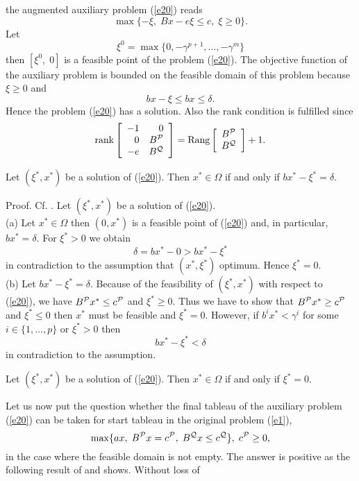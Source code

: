 the augmented auxiliary problem (\ref{e20}) reads
%
\begin{equation} \label{e21}
\max \{- \xi , \; Bx - e\xi  \leq c, \; \xi  \geq 0\}.
\end{equation}
Let
\[
\xi ^0 = \max\{0, -\gamma^{p+1}, \ldots, - \gamma ^m\}
\]
then $[\xi ^0, \; 0]$ is a feasible point of
the problem (\ref{e20}).  The objective function of the auxiliary problem is
bounded on the feasible domain of this problem because $\xi \geq 0$ and
\[
bx - \xi \leq bx \leq \delta .
\]
Hence the problem (\ref{e20}) has a solution. Also the rank condition is
fulfilled since
\[
\rank \ba{[}{rr} -1 & 0\\0 & B^{\P}\\-e & B^{\Q} \ea{]}
= \Rang \ba{[}{l}B^{\P}\\B^{\Q} \ea{]} + 1.
\]
%
%
\begin{lemma} \label{l6}
Let $(\xi ^*,x^*)$ be a solution of (\ref{e20}). Then $x^* \in
\Omega$ if and only if $bx^* - \xi ^* = \delta $.
\end{lemma}
%
Proof. Cf. \cite{BeRi}. Let $(\xi ^*, x^*)$ be a solution of
(\ref{e20}).\\
(a) Let $x^* \in \Omega$ then $(0,x^*)$ is a feasible point of
(\ref{e20}) and, in particular, $bx^* = \delta $. For $\xi ^* >
0$ we obtain
\[
\delta = bx^* - 0 > bx^* - \xi ^*
\]
in contradiction to the assumption that $(x^*,\xi ^*)$ optimum.  Hence $\xi ^*
= 0$.\\
%
(b) Let $bx^* - \xi ^* = \delta $.  Because of the feasibility of $(\xi
^*,x^*)$ with respect to (\ref{e20}), we have $B^{\P}x^* \leq c^{\P}$ and $\xi
^* \geq 0$.  Thus we have to show that $B^{\P}x^* \geq c^{\P}$ and $\xi ^* \leq
0$ then $x^*$ must be feasible and $\xi ^* = 0$.  However, if $b^ix^* < \gamma
^i$ for some $i \in \{1, \ldots, p\}$ or $\xi ^* > 0$ then
\[
bx^* - \xi ^* < \delta
\]
in contradiction to the assumption.
%
\begin{corollary} \label{f6} Let $(\xi ^*,x^*)$ be a solution of
(\ref{e20}). Then $x^* \in \Omega$ if and only if $\xi ^* = 0$.
\end{corollary}
\par
\par
Let us now put the question whether the final tableau of the auxiliary problem
(\ref{e20}) can be taken for start tableau in the original problem (\ref{e1}),
\[
\max \{ax ,\; B^{\P}x = c^{\P}, \; B^{\Q}x \leq c^{\Q}\}, \; c^{\P} \geq 0,
\]
in the case where the feasible domain is not empty.  The answer is positive as
the following result of \cite{BeRi} and \cite{Bau} shows.  Without loss of
